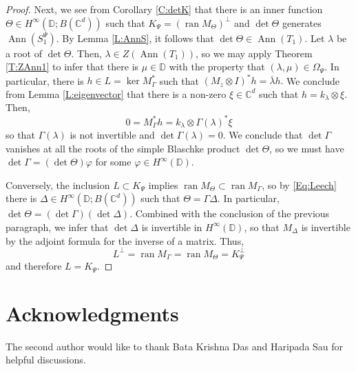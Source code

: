 \documentclass[10pt]{amsart}
\newcommand{\bC}{{\mathbb{C}}}
\newcommand{\bD}{{\mathbb{D}}}
\renewcommand{\phi}{\varphi}
\newcommand{\ol}{\overline}
\newcommand{\ran}{\operatorname{ran}}
\newcommand{\Ann}{\operatorname{Ann}}
\theoremstyle{definition}
\begin{document}
\begin{proof}
Next, we see from Corollary \ref{C:detK} that there is an inner function $\Theta\in H^\infty(\bD;B(\bC^d))$ such that $K_\Psi=(\ran M_\Theta)^\perp$ and $\det \Theta$ generates $\Ann(S^\Psi_1)$. By Lemma \ref{L:AnnS}, it follows that $\det \Theta\in \Ann(T_1)$.  Let $\lambda$ be a root of $\det \Theta$. Then, $\lambda\in Z(\Ann (T_1))$, so we may apply Theorem \ref{T:ZAnn1}  to infer that there is $\mu\in \bD$ with the property that $(\lambda,\mu)\in \Omega_\Psi$. In particular, there is $h\in L=\ker M_\Gamma^*$ such that $(M_z\otimes I)^* h=\ol{\lambda} h.$ We conclude from Lemma \ref{L:eigenvector} that there is a non-zero $\xi\in \bC^d$ such that $h=k_\lambda\otimes \xi$. Then,
\[
0=M_\Gamma^* h=k_\lambda\otimes \Gamma(\lambda)^*\xi
\]
so that $\Gamma(\lambda)$ is not invertible and $\det\Gamma(\lambda)=0$. We conclude that $\det \Gamma$ vanishes at all the roots of the simple Blaschke product $\det \Theta$, so we must have $\det\Gamma=( \det \Theta)\phi$ for some $\phi\in H^\infty(\bD)$. 

Conversely, the inclusion $L\subset K_\Psi$ implies $\ran M_\Theta\subset \ran M_\Gamma$, so by \eqref{Eq:Leech} there is $\Delta\in H^\infty(\bD;B(\bC^d))$ such that $\Theta=\Gamma \Delta$. In particular, $\det \Theta =(\det \Gamma)(\det \Delta)$. Combined with the conclusion of the previous paragraph, we infer that $\det\Delta$ is invertible in $H^\infty(\bD)$, so that $ M_\Delta$ is invertible by the adjoint formula for the inverse of a matrix. Thus, $$L^\perp=\ran M_\Gamma=\ran M_\Theta=K_\Psi^\perp$$ and therefore $L=K_\Psi$.
\end{proof}

\section*{Acknowledgments}
The second author would like to thank Bata Krishna Das and Haripada Sau for helpful discussions. 


  
	
\end{document}
